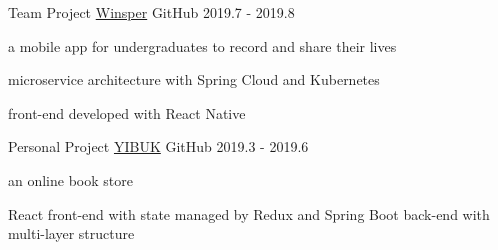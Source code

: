 \begin{cventries}
  \cventry
    {Team Project} %
    {\href{https://github.com/mosaikerors/Winsper}{Winsper}} %
    {GitHub} %
    {2019.7 - 2019.8} %
    {
      \begin{cvitems} %
        \item a mobile app for undergraduates to record and share their lives
        \item microservice architecture with Spring Cloud and Kubernetes
        \item front-end developed with React Native
      \end{cvitems}
    }

  \cventry
    {Personal Project} %
    {\href{https://github.com/Gusabary/YIBUK}{YIBUK}} %
    {GitHub} %
    {2019.3 - 2019.6} %
    {
      \begin{cvitems} %
        \item an online book store
        \item React front-end with state managed by Redux and Spring Boot back-end with multi-layer structure
      \end{cvitems}
    }

\end{cventries}
